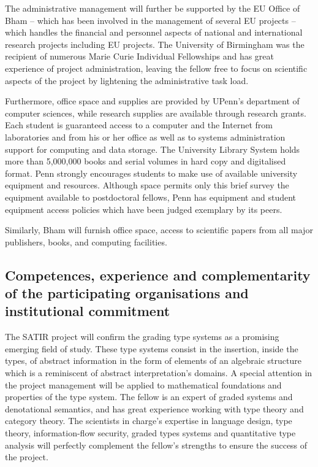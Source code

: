 \documentclass{article}[11pt]
\begin{document}
The administrative management will further be supported by the EU Office  of Bham – which has been involved in the management of several EU projects – which handles the financial and personnel aspects of national and international research projects including EU projects. The University of Birmingham was the recipient of numerous  Marie Curie Individual Fellowships and has great experience of project administration, leaving the fellow free to focus on scientific aspects of the project by lightening the administrative task load.

Furthermore, office space and supplies are provided by UPenn's department of computer sciences, while research supplies are available through research grants. Each student is guaranteed access to a computer and the Internet from laboratories and from his or her office as well as to systems administration support for computing and data storage. The University Library System holds more than 5,000,000 books and serial volumes in hard copy and digitalised format. Penn strongly encourages students to make use of available university equipment and resources.  Although space permits only this brief survey the equipment available to postdoctoral fellows, Penn has equipment and student equipment access policies which have been judged exemplary by its peers.

Similarly, Bham will furnish office space, access to scientific papers from all major publishers,
books, and computing facilities.


\subsection{Competences, experience and complementarity of the participating organisations and institutional commitment}
The SATIR project will confirm the grading type systems as a promising emerging field of study. These type systems consist in the insertion, inside the types, of abstract information in the form of elements of an algebraic structure which is a reminiscent of abstract interpretation's domains. A special attention in the project management will be applied to mathematical foundations and properties of the type system. The fellow is an expert of graded systems and denotational semantics, and has great experience working with type theory and category theory.  The scientists in charge’s expertise in language design, type theory, information-flow security, graded types systems and quantitative type analysis will perfectly complement the fellow’s strengths to ensure the success of the project.
\end{document}
